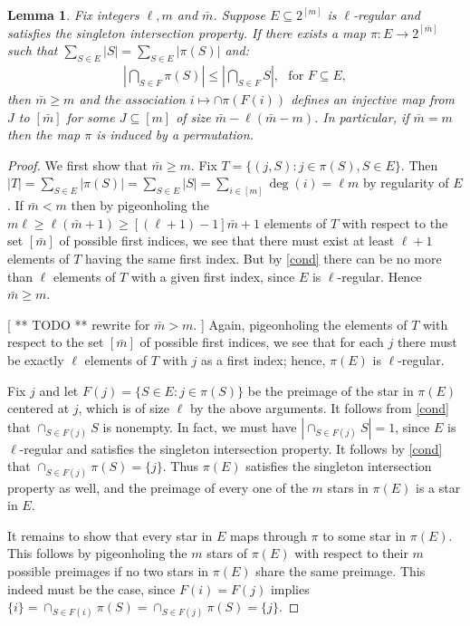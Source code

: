 \documentclass[9pt,twocolumn]{pnas-new}
\newtheorem{lemma}{Lemma}
\begin{document}
\begin{lemma}\label{NonEmptyLemma} 
Fix integers $\ell, m$ and $\bar m$. Suppose $E \subseteq 2^{[m]}$ is $\ell$-regular and satisfies the singleton intersection property. If there exists a map $\pi: E \to 2^{[\bar m]}$ such that $\sum_{S \in E} |S| = \sum_{S \in E} |\pi(S)|$ and:
\begin{align}\label{cond}
|\bigcap_{S \in F} \pi(S)| \leq |\bigcap_{S \in F} S |,\ \ \   \text{for } F \subseteq E,
\end{align}
%
then $\bar m \geq m$ and the association $i \mapsto \cap \pi(F(i))$ defines an injective map from $J$ to $[\bar m]$ for some $J \subseteq [m]$ of size $\bar m - \ell(\bar m - m)$. In particular, if $\bar m = m$ then the map $\pi$ is induced by a permutation.
\end{lemma}
\begin{proof}
We first show that $\bar m \geq m$. Fix $T = \{(j, S): j \in \pi(S), S \in E\}$. Then $|T| = \sum_{S \in E} |\pi(S)| = \sum_{S \in E} |S| = \sum_{i \in [m]} \deg(i) = \ell m$ by regularity of $E$. If $\bar m < m$ then by pigeonholing the $m \ell \geq \ell (\bar m + 1) \geq [(\ell + 1) - 1] \bar m + 1$ elements of $T$ with respect to the set $[\bar m]$ of possible first indices, we see that there must exist at least $\ell + 1$ elements of $T$ having the same first index. But by \eqref{cond} there can be no more than $\ell$ elements of $T$ with a given first index, since $E$ is $\ell$-regular. Hence $\bar m \geq m$. 

[ ** TODO ** rewrite for $\bar m > m$. ]
Again, pigeonholing the elements of $T$ with respect to the set $[\bar m]$ of possible first indices, we see that for each $j$ there must be exactly $\ell$ elements of $T$ with $j$ as a first index; hence, $\pi(E)$ is $\ell$-regular. 

Fix $j$ and let $F(j) = \{S \in E: j \in \pi(S)\}$ be the preimage of the star in $\pi(E)$ centered at $j$, which is of size $\ell$ by the above arguments. It follows from \eqref{cond} that $\cap_{S \in F(j)} S$ is nonempty. In fact, we must have $|\cap _{S \in F(j)} S| = 1$, since $E$ is $\ell$-regular and satisfies the singleton intersection property. It follows by \eqref{cond} that $\cap_{S \in F(j)} \pi(S) = \{j\}$. Thus $\pi(E)$ satisfies the singleton intersection property as well, and the preimage of every one of the $m$ stars in $\pi(E)$ is a star in $E$.

It remains to show that every star in $E$ maps through $\pi$ to some star in $\pi(E)$. This follows by pigeonholing the $m$ stars of $\pi(E)$ with respect to their $m$ possible preimages if no two stars in $\pi(E)$ share the same preimage. This indeed must be the case, since $F(i) = F(j)$ implies $\{i\} = \cap_{S \in F(i)} \pi(S) = \cap_{S \in F(j)} \pi(S) = \{j\}$.
\end{proof}
\end{document}

